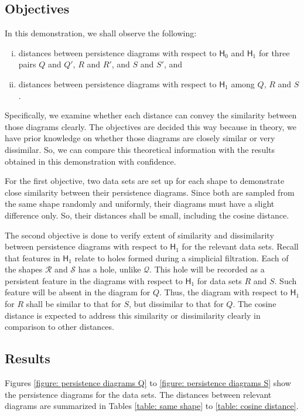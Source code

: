 \documentclass[sn-mathphys-num]{sn-jnl}%
\theoremstyle{thmstyleone}%
\theoremstyle{thmstyletwo}%
\theoremstyle{thmstylethree}%
\begin{document}
\subsection{Objectives}
In this demonstration, we shall observe the following:
\begin{enumerate}[(i)]
	\item distances between persistence diagrams with respect to $\mathsf{H}_0$ and $\mathsf{H}_1$ for three pairs $Q$ and $Q'$, $R$ and $R'$, and $S$ and $S'$, and
	\item distances between persistence diagrams with respect to $\mathsf{H}_1$ among $Q$, $R$ and $S$.
\end{enumerate}
Specifically, we examine whether each distance can convey the similarity between those diagrams clearly. The objectives are decided this way because in theory, we have prior knowledge on whether those diagrams are closely similar or very dissimilar. So, we can compare this theoretical information with the results obtained in this demonstration with confidence.

For the first objective, two data sets are set up for each shape to demonstrate close similarity between their persistence diagrams. Since both are sampled from the same shape randomly and uniformly, their diagrams must have a slight difference only. So, their distances shall be small, including the cosine distance.

The second objective is done to verify extent of similarity and dissimilarity between persistence diagrams with respect to $\mathsf{H}_1$ for the relevant data sets. Recall that features in $\mathsf{H}_1$ relate to holes formed during a simplicial filtration. Each of the shapes $\mathcal{R}$ and $\mathcal{S}$ has a hole, unlike $\mathcal{Q}$. This hole will be recorded as a persistent feature in the diagrams with respect to $\mathsf{H}_1$ for data sets $R$ and $S$. Such feature will be absent in the diagram for $Q$. Thus, the diagram with respect to $\mathsf{H}_1$ for $R$ shall be similar to that for $S$, but dissimilar to that for $Q$. The cosine distance is expected to address this similarity or dissimilarity clearly in comparison to other distances.

\subsection{Results}

Figures \ref{figure: persistence diagrams Q} to \ref{figure: persistence diagrams S} show the persistence diagrams for the data sets. The distances between relevant diagrams are summarized in Tables \ref{table: same shape} to \ref{table: cosine distance}.
\end{document}
